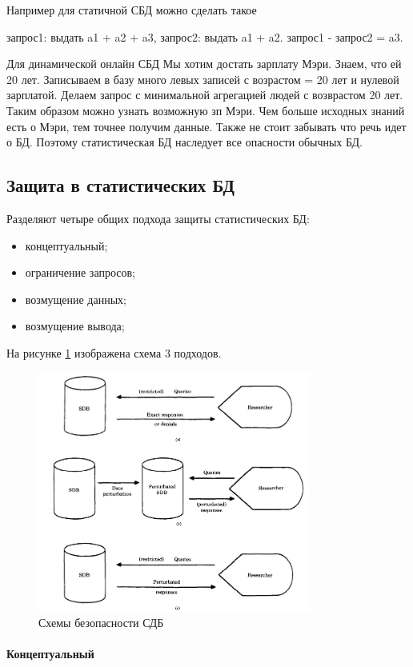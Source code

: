 Например для статичной СБД можно сделать такое

запрос1: выдать a1 + a2 + a3, запрос2: выдать a1 + a2. запрос1 - запрос2 = a3.

Для динамической онлайн СБД
Мы хотим достать зарплату Мэри. Знаем, что ей 20 лет. Записываем в базу много левых записей с возрастом = 20 лет и нулевой зарплатой. Делаем запрос с минимальной агрегацией людей с возврастом 20 лет. Таким образом можно узнать возможную зп Мэри. Чем больше исходных знаний есть о Мэри, тем точнее получим данные.
Также не стоит забывать что речь идет о БД. Поэтому статистическая БД наследует все опасности обычных БД.

  \subsection{Защита в статистических БД}

Разделяют четыре общих подхода защиты статистических БД:
\begin{itemize}
  \item концептуальный;
	\item ограничение запросов;
	\item возмущение данных;
	\item возмущение вывода;
\end{itemize}
На рисунке \ref{fig:SDB_secure} изображена схема 3 подходов.
\begin{figure}[h]
    \centering
    \includegraphics[width=0.8\textwidth]{assets/SDB_secure_method.png}
    \caption{Схемы безопасности СДБ}
    \label{fig:SDB_secure}
\end{figure}
\paragraph{Концептуальный}

